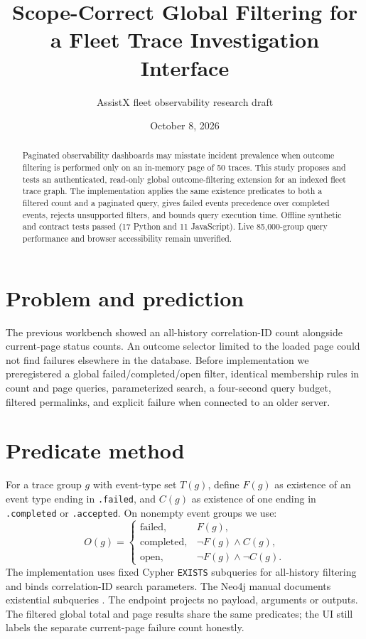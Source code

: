 \documentclass[11pt]{article}
\title{Scope-Correct Global Filtering for a Fleet Trace Investigation Interface}
\author{AssistX fleet observability research draft}
\date{October 8, 2026}
\begin{document}
\maketitle
\begin{abstract}
Paginated observability dashboards may misstate incident prevalence when outcome filtering is performed only on an in-memory page of 50 traces. This study proposes and tests an authenticated, read-only global outcome-filtering extension for an indexed fleet trace graph. The implementation applies the same existence predicates to both a filtered count and a paginated query, gives failed events precedence over completed events, rejects unsupported filters, and bounds query execution time. Offline synthetic and contract tests passed (17 Python and 11 JavaScript). Live 85,000-group query performance and browser accessibility remain unverified.
\end{abstract}
\section{Problem and prediction}
The previous workbench showed an all-history correlation-ID count alongside current-page status counts. An outcome selector limited to the loaded page could not find failures elsewhere in the database. Before implementation we preregistered a global failed/completed/open filter, identical membership rules in count and page queries, parameterized search, a four-second query budget, filtered permalinks, and explicit failure when connected to an older server.
\section{Predicate method}
For a trace group $g$ with event-type set $T(g)$, define $F(g)$ as existence of an event type ending in \texttt{.failed}, and $C(g)$ as existence of one ending in \texttt{.completed} or \texttt{.accepted}. On nonempty event groups we use:
\[
O(g) = \begin{cases}
\mathrm{failed}, & F(g),\\
\mathrm{completed}, & \neg F(g)\wedge C(g),\\
\mathrm{open}, & \neg F(g)\wedge\neg C(g).
\end{cases}
\]
The implementation uses fixed Cypher \texttt{EXISTS} subqueries for all-history filtering and binds correlation-ID search parameters. The Neo4j manual documents existential subqueries \cite{neo4jexists}. The endpoint projects no payload, arguments or outputs. The filtered global total and page results share the same predicates; the UI still labels the separate current-page failure count honestly.
\end{document}
